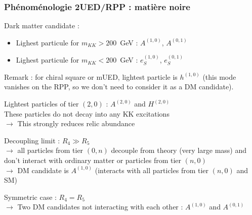 \begin{frame}[plain]
\frametitle{Phénoménologie 2UED/RPP : matière noire}
\begin{maliste}
\item Dark matter candidate :
\begin{itemize}
\item Lighest particule for $m_{KK}>200$~GeV : $A^{(1,0)}$, $A^{(0,1)}$
\item Lighest particule for $m_{KK}<200$~GeV : $e_S^{(1,0)}$, $e_S^{(0,1)}$
\end{itemize}
\vspace*{0.2cm}
Remark : for chiral square or mUED, lightest particle is $h^{(1,0)}$ (this mode vanishes on the RPP, so we don't need to consider it as a DM candidate).\\
\vspace*{0.5cm}
\item Lightest particles of tier $(2,0)$ : $A^{(2,0)}$ and $H^{(2,0)}$ \\
These particles do not decay into any KK excitations\\
$\rightarrow$ This strongly reduces relic abundance
\vspace*{0.5cm}
\item Decoupling limit : $R_4 \gg R_5$\\
$\rightarrow$ all particles from tier $(0,n)$ decouple from theory (very large mass) and don't interact with ordinary matter or particles from tier $(n,0)$\\
$\rightarrow$ DM candidate is $A^{(1,0)}$ (interacts with all particles from tier $(n,0)$ and SM)
\item Symmetric case : $R_4 = R_5$\\
$\rightarrow$ Two DM candidates not interacting with each other : $A^{(1,0)}$ and $A^{(0,1)}$
\end{maliste}
\end{frame}

